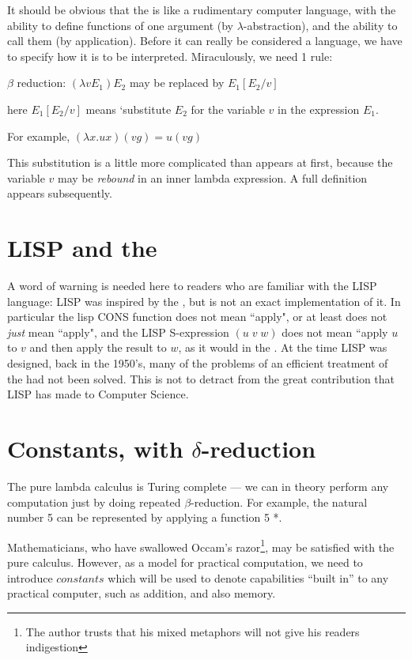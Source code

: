 It should be obvious that the \LC is like a rudimentary computer
language, with the ability to define functions of one argument (by
$\lambda$-abstraction), and the ability to call them (by application).
Before it can really be considered a language, we have to specify how it is
to be interpreted. Miraculously, we need 1 rule:

$\beta$ reduction: $(\lambda v E_1)E_2$ may be replaced by $E_1[E_2/v]$


here $E_1[E_2/v]$ means `substitute $E_2$ for the variable $v$ in the
expression $E_1$.

For example, $(\lambda x. u x) (v g) = u (v g)$

This substitution is a little more complicated than
appears at first, because the variable $v$ may be {\em rebound} in an
inner lambda expression. A full definition appears subsequently.

\section{LISP and the \LC}

A word of warning is needed here to readers who are familiar with the  LISP
language: LISP was inspired by the \LC, but is not an exact  implementation
of it. In particular the lisp CONS  function does not mean ``apply", or  at
least does  not  {\em  just}  mean  ``apply",  and  the  LISP  S-expression
$(u\;v\;w)$ does not mean ``apply $u$ to  $v$ and then apply the result  to
$w$, as it would  in the \LC. At  the time LISP was  designed, back in  the
1950's, many of the problems of an  efficient treatment of the \LC had  not
been solved. This is not to  detract from the great contribution that  LISP
has made to Computer Science.

\section{Constants, with $\delta$-reduction}

The pure lambda calculus is Turing complete --- we can in theory perform
any computation just by doing repeated
$\beta$-reduction. For example, the natural
number 5 can be represented by applying a function 5 *.

Mathematicians, who have swallowed Occam's razor\footnote{The author
trusts that his mixed metaphors will not give his readers indigestion},
may be satisfied with the pure calculus. However, as a model for practical
computation, we need to introduce $constants$ which will be used to denote
capabilities ``built in'' to any practical computer, such as addition, and
also memory.

